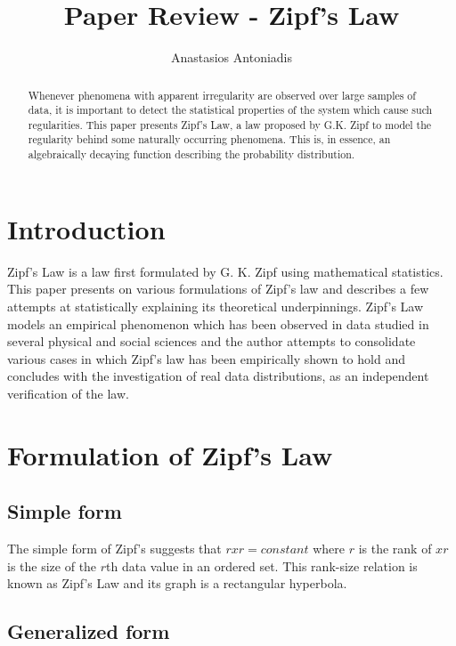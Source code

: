 \documentclass{article} \usepackage{hyperref} \usepackage{graphicx}
\begin{document}
\title{Paper Review - Zipf's Law} \author{Anastasios Antoniadis}

\maketitle

\begin{abstract}

Whenever phenomena with apparent irregularity are observed over large
samples of data, it is important to detect the statistical properties of the
system which cause such regularities. This paper presents Zipf's Law, a law
proposed by G.K. Zipf to model the regularity behind some naturally
occurring phenomena. This is, in essence, an algebraically decaying function
describing the probability distribution.
\end{abstract}

\section{Introduction}

Zipf's Law is a law first formulated by G. K. Zipf using mathematical
statistics. This paper presents on various formulations of Zipf's law and
describes a few attempts at statistically explaining its theoretical
underpinnings. Zipf's Law models an empirical phenomenon which has been
observed in data studied in several physical and social sciences and the
author attempts to consolidate various cases in which Zipf's law has been
empirically shown to hold and concludes with the investigation of real data
distributions, as an independent verification of the law.

\section{Formulation of Zipf's Law}
\subsection{Simple form}

The simple form of Zipf's suggests that $rxr = constant$ where $r$ is the
rank of $xr$ is the size of the $r$th data value in an ordered set. This
rank-size relation is known as Zipf's Law and its graph is a rectangular
hyperbola.

\subsection{Generalized form}
\end{document}
